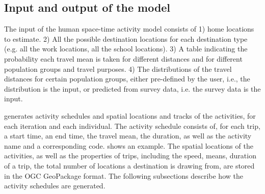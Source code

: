 \documentclass[]{article}
\begin{document}
\subsection{Input and output of the model}

The input of the human space-time activity model consists of 1) home locations to estimate. 2) All the possible destination locations for each destination type (e.g. all the work locations, all the school locations). 3) A table indicating the probability each travel mean is taken for different distances and for different population groups and travel purposes. 4) The distributions of the travel distances for certain population groups, either pre-defined by the user, i.e., the distribution is the input, or predicted from survey data, i.e. the survey data is the input.
 

generates activity schedules and spatial locations and tracks of the activities, for each iteration and each individual. The activity schedule consists of, for each trip, a start time, an end time, the travel mean, the duration, as well as the activity name and a corresponding code.  shows an example. The spatial locations of the activities, as well as the properties of trips, including the speed, means, duration of a trip, the total number of locations a destination is drawing from, are stored in the OGC GeoPackage format. The following subsections describe how the activity schedules are generated. 
\end{document}
